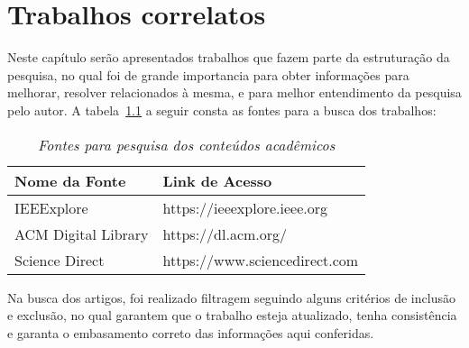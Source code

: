 \newcommand{\hashfootnote}{
    \footnote{
        O algoritmo \textit{hash} é conhecido como uma função matemática
        criptográfica, na qual você possui dados de entrada e, após passar
        pela criptografia, eles apresentam valores de saída "padronizados", ou
        seja, as saídas devem possuir o mesmo tamanho (geralmente entre 128 e
        512 bits) e o mesmo número de caracteres alfanuméricos.
        Disponivel em :
        \url{https://www.voitto.com.br/blog/artigo/o-que-e-hash-e-como-funciona}
    }
}
\chapter{Trabalhos correlatos}\label{ch:trabalhos-correlatos}

Neste capítulo serão apresentados trabalhos que fazem parte da
estruturação da pesquisa, no qual foi de grande importancia para
obter informações para melhorar, resolver relacionados à mesma, e
para melhor entendimento da pesquisa pelo autor.
A tabela~\ref{tab:fontes-pesquisa} a seguir consta as fontes para a
busca dos trabalhos:

\begin{table}[h!]
    \centering
    \begin{tabular}{|m{4cm}|m{4.5cm}|}
        \hline
        Nome da Fonte       & Link de Acesso                \\ \hline
        IEEExplore          & https://ieeexplore.ieee.org   \\ \hline
        ACM Digital Library & https://dl.acm.org/           \\ \hline
        Science Direct      & https://www.sciencedirect.com \\ \hline
    \end{tabular}
    \caption[Fontes de pesquisa]{\textit{Fontes para pesquisa dos
    conteúdos acadêmicos}}
    \label{tab:fontes-pesquisa}
\end{table}

Na busca dos artigos, foi realizado filtragem seguindo alguns
critérios de inclusão e exclusão, no qual garantem que o trabalho
esteja atualizado, tenha consistência e garanta o embasamento
correto das informações aqui conferidas.

